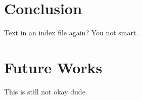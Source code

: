 \chapter{Conclusion}
Text in an index file again? You not smart.
\chapter{Future Works}
This is still not okay dude.
